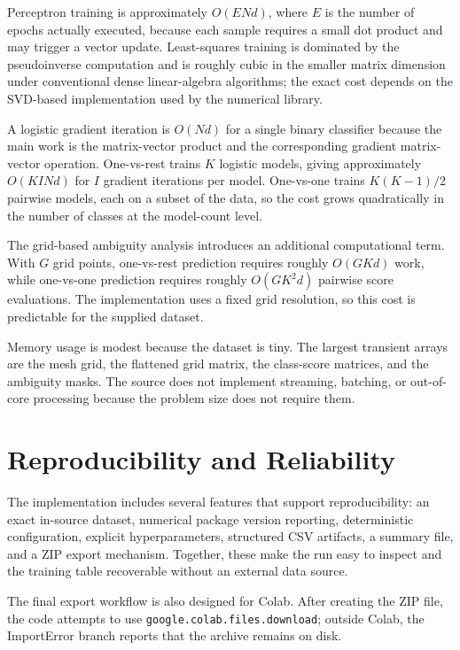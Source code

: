 \documentclass[11pt,a4paper]{article}
\newcommand{\code}[1]{\texttt{#1}}
\begin{document}
Perceptron training is approximately \(O(E N d)\), where \(E\) is the number of epochs actually executed, because each sample requires a small dot product and may trigger a vector update. Least-squares training is dominated by the pseudoinverse computation and is roughly cubic in the smaller matrix dimension under conventional dense linear-algebra algorithms; the exact cost depends on the SVD-based implementation used by the numerical library.

A logistic gradient iteration is \(O(Nd)\) for a single binary classifier because the main work is the matrix-vector product and the corresponding gradient matrix-vector operation. One-vs-rest trains \(K\) logistic models, giving approximately \(O(KI N d)\) for \(I\) gradient iterations per model. One-vs-one trains \(K(K-1)/2\) pairwise models, each on a subset of the data, so the cost grows quadratically in the number of classes at the model-count level.

The grid-based ambiguity analysis introduces an additional computational term. With \(G\) grid points, one-vs-rest prediction requires roughly \(O(GKd)\) work, while one-vs-one prediction requires roughly \(O(GK^2d)\) pairwise score evaluations. The implementation uses a fixed grid resolution, so this cost is predictable for the supplied dataset.

Memory usage is modest because the dataset is tiny. The largest transient arrays are the mesh grid, the flattened grid matrix, the class-score matrices, and the ambiguity masks. The source does not implement streaming, batching, or out-of-core processing because the problem size does not require them.

\section{Reproducibility and Reliability}
The implementation includes several features that support reproducibility: an exact in-source dataset, numerical package version reporting, deterministic configuration, explicit hyperparameters, structured CSV artifacts, a summary file, and a ZIP export mechanism. Together, these make the run easy to inspect and the training table recoverable without an external data source.

The final export workflow is also designed for Colab. After creating the ZIP file, the code attempts to use \code{google.colab.files.download}; outside Colab, the ImportError branch reports that the archive remains on disk.
\end{document}
